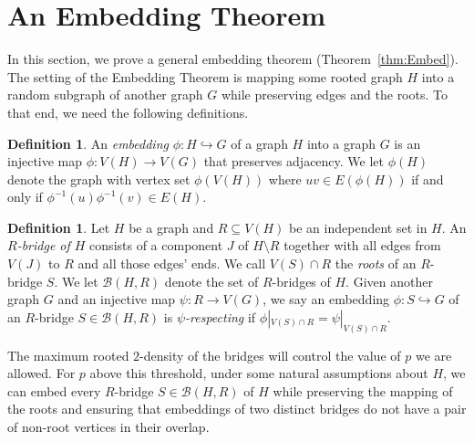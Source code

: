 \documentclass[11pt]{article}
\numberwithin{equation}{section}
\newcounter{i}
\theoremstyle{plain}
\theoremstyle{plain} %
\theoremstyle{definition}
\newtheorem{definition}[thm]{Definition}
\newcommand{\cB}{\mathcal{B}}
\begin{document}

\section{An Embedding Theorem}\label{s:Embed}

In this section, we prove a general embedding theorem (Theorem~\ref{thm:Embed}). 
The setting of the Embedding Theorem is mapping some rooted graph $H$ into a random subgraph of another graph $G$ while preserving edges and the roots. To that end, we need the following definitions.

\begin{definition}
    An \textit{embedding} $\phi : H \hookrightarrow G$ of a graph $H$ into a graph $G$ is an injective map $\phi : V(H) \rightarrow V(G)$ that preserves adjacency.  We let $\phi(H)$ denote the graph with vertex set $\phi(V(H))$ where $uv\in E(\phi(H))$ if and only if $\phi^{-1}(u)\phi^{-1}(v) \in E(H)$.
\end{definition}
\begin{definition}
Let $H$ be a graph and $R\subseteq V(H)$ be an independent set in $H$. 
An \emph{$R$-bridge of $H$} consists of a component $J$ of $H\setminus R$ together with all edges from $V(J)$ to $R$ and all those edges' ends.  We call $V(S) \cap R$ the \textit{roots} of an $R$-bridge $S$.
We let $\cB(H, R)$ denote the set of $R$-bridges of $H$.  
Given another graph $G$ and an injective map $\psi : R \rightarrow V(G)$, we say an embedding $\phi : S \hookrightarrow G$ of an $R$-bridge $S \in \cB(H, R)$ is \textit{$\psi$-respecting} if $\phi|_{V(S)\cap R} = \psi|_{V(S) \cap R}$.
\end{definition}

The maximum rooted $2$-density of the bridges will control the value of $p$ we are allowed.  For $p$ above this threshold, under some natural assumptions about $H$, we can embed every $R$-bridge $S \in \cB(H, R)$ of $H$ while preserving the mapping of the roots and ensuring that embeddings of two distinct bridges do not have a pair of non-root vertices in their overlap. 
\end{document}
